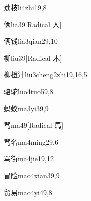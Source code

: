 \begin{verbete}{荔枝}{li4zhi1}{9,8}
\end{verbete}

\begin{verbete}{俩}{lia3}{9}[Radical 人]
\end{verbete}

\begin{verbete}{俩钱}{lia3qian2}{9,10}
\end{verbete}

\begin{verbete}{柳}{liu3}{9}[Radical 木]
\end{verbete}

\begin{verbete}{柳橙汁}{liu3cheng2zhi1}{9,16,5}
\end{verbete}

\begin{verbete}{骆驼}{luo4tuo5}{9,8}
\end{verbete}

\begin{verbete}{蚂蚁}{ma3yi3}{9,9}
\end{verbete}

\begin{verbete}{骂}{ma4}{9}[Radical 馬]
\end{verbete}

\begin{verbete}{骂名}{ma4ming2}{9,6}
\end{verbete}

\begin{verbete}{骂街}{ma4jie1}{9,12}
\end{verbete}

\begin{verbete}{冒险}{mao4xian3}{9,9}
\end{verbete}

\begin{verbete}{贸易}{mao4yi4}{9,8}
\end{verbete}

